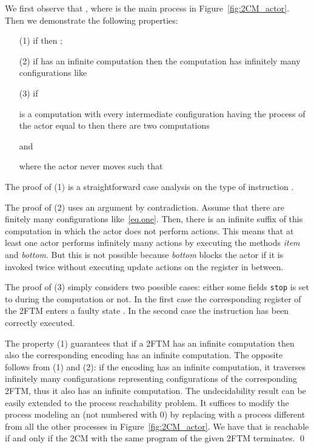 \documentclass{LMCS}
\theoremstyle{plain}\newtheorem{proposition}[thm]{Proposition}
\theoremstyle{plain}\newtheorem{lemma}[thm]{Lemma}
\theoremstyle{plain}\newtheorem{theorem}[thm]{Theorem}
\theoremstyle{plain}\newtheorem{corollary}[thm]{Corollary}
\begin{document}
We first observe that , where  is the main process in 
Figure~\ref{fig:2CM_actor}.
Then we demonstrate the following properties:
\begin{enumerate}
\item[(1)]
if  then 
;

\item[(2)]
if  has an infinite computation then 
the computation has infinitely many configurations like


\item[(3)]
if

is a computation with every intermediate configuration having the process of
the actor  equal to  then there are two computations

and

where the actor  never moves such that

\end{enumerate}

\noindent The proof of (1) is a straightforward case analysis on the 
type of instruction .

The proof of (2) uses an argument by contradiction. Assume that there are 
finitely many configurations like~\ref{eq.one}. Then, there is an infinite
suffix of this computation in which the actor  does not perform actions.
This means that at least one actor  performs infinitely many actions
by executing the methods {\it item} and {\it bottom}. But this is not possible
because {\it bottom} blocks the actor if it is invoked twice without
executing update actions on the register in between.

The proof of (3) simply considers two possible cases: either some
fields {\tt stop} is set to  during the computation or not.
In the first case the corresponding register of the 2FTM enters a faulty state
. In the second case the instruction has been correctly
executed.





The property (1) guarantees that if a 2FTM has an infinite computation
then also the corresponding encoding has an infinite computation.
The opposite follows from (1) and (2): if the encoding has an infinite
computation, it traverses infinitely many configurations representing
configurations of the corresponding 2FTM, thus it also has an infinite 
computation.
The undecidability result can be easily extended
to the process reachability problem. It suffices to
modify the process modeling an  (not numbered with 0)
by replacing  with 
a process  different from all the other processes in
Figure~\ref{fig:2CM_actor}. We have that
 is reachable if and only if the 2CM with the same program of
the given 2FTM terminates.
\qed
\fi
\end{document}
